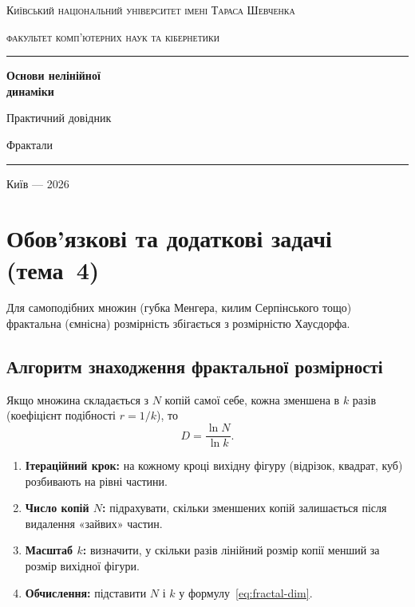 \documentclass[12pt,a4paper]{article}
\begin{document}
\begin{titlepage}
\thispagestyle{empty}
\centering
\vspace*{1cm}
{\scshape\large Київський національний університет імені Тараса Шевченка\par}
{\scshape факультет комп'ютерних наук та кібернетики\par}
\vspace{1.5cm}
{\color{accent}\rule{\linewidth}{1.2pt}\par}
\vspace{0.6cm}
{\Huge\bfseries Основи нелінійної\\[0.25em] динаміки\par}
\vspace{0.5cm}
{\LARGE Практичний довідник\par}
\vspace{0.35cm}
{\large Фрактали\par}
\vspace{0.4cm}
{\color{accent}\rule{\linewidth}{1.2pt}\par}
\vfill
{\small Київ --- 2026\par}
\end{titlepage}

\tableofcontents
\newpage

\section{Обов'язкові та додаткові задачі (тема~4)}

Для самоподібних множин (губка Менгера, килим Серпінського тощо) фрактальна
(ємнісна) розмірність збігається з розмірністю Хаусдорфа.

\subsection{Алгоритм знаходження фрактальної розмірності}

Якщо множина складається з $N$ копій самої себе, кожна зменшена в $k$ разів
(коефіцієнт подібності $r=1/k$), то
\begin{equation}
  D=\frac{\ln N}{\ln k}.
  \label{eq:fractal-dim}
\end{equation}

\begin{enumerate}[leftmargin=1.6em]
  \item \textbf{Ітераційний крок:} на кожному кроці вихідну фігуру (відрізок,
        квадрат, куб) розбивають на рівні частини.
  \item \textbf{Число копій $N$:} підрахувати, скільки зменшених копій залишається
        після видалення «зайвих» частин.
  \item \textbf{Масштаб $k$:} визначити, у скільки разів лінійний розмір копії
        менший за розмір вихідної фігури.
  \item \textbf{Обчислення:} підставити $N$ і $k$ у формулу~\eqref{eq:fractal-dim}.
\end{enumerate}
\end{document}
